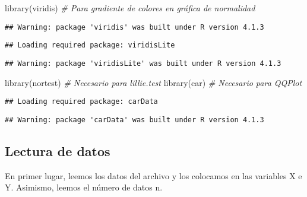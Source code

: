 \documentclass[
]{article}
\newenvironment{Shaded}{\begin{snugshade}}{\end{snugshade}}
\newcommand{\CommentTok}[1]{\textcolor[rgb]{0.56,0.35,0.01}{\textit{#1}}}
\newcommand{\FunctionTok}[1]{\textcolor[rgb]{0.00,0.00,0.00}{#1}}
\newcommand{\NormalTok}[1]{#1}
\begin{document}
\begin{Shaded}
\begin{Highlighting}[]
\FunctionTok{library}\NormalTok{(viridis)      }\CommentTok{\# Para gradiente de colores en gráfica de normalidad}
\end{Highlighting}
\end{Shaded}

\begin{verbatim}
## Warning: package 'viridis' was built under R version 4.1.3
\end{verbatim}

\begin{verbatim}
## Loading required package: viridisLite
\end{verbatim}

\begin{verbatim}
## Warning: package 'viridisLite' was built under R version 4.1.3
\end{verbatim}

\begin{Shaded}
\begin{Highlighting}[]
\FunctionTok{library}\NormalTok{(nortest)      }\CommentTok{\# Necesario para lillie.test}
\FunctionTok{library}\NormalTok{(car)          }\CommentTok{\# Necesario para QQPlot}
\end{Highlighting}
\end{Shaded}

\begin{verbatim}
## Loading required package: carData
\end{verbatim}

\begin{verbatim}
## Warning: package 'carData' was built under R version 4.1.3
\end{verbatim}

\hypertarget{lectura-de-datos}{%
\subsection{Lectura de datos}\label{lectura-de-datos}}

En primer lugar, leemos los datos del archivo y los colocamos en las
variables X e Y. Asimismo, leemos el número de datos n.
\end{document}
